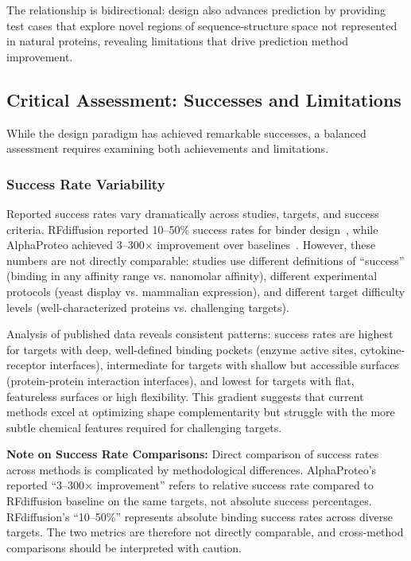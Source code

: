 The relationship is bidirectional: design also advances prediction by providing test cases that explore novel regions of sequence-structure space not represented in natural proteins, revealing limitations that drive prediction method improvement.

\subsection{Critical Assessment: Successes and Limitations}
\label{subsec:critical}

While the design paradigm has achieved remarkable successes, a balanced assessment requires examining both achievements and limitations.

\subsubsection{Success Rate Variability}

Reported success rates vary dramatically across studies, targets, and success criteria. RFdiffusion reported 10--50\% success rates for binder design~\citep{watson2023rfdiffusion}, while AlphaProteo achieved 3--300$\times$ improvement over baselines~\citep{zambaldi2024alphaproteo}. However, these numbers are not directly comparable: studies use different definitions of ``success'' (binding in any affinity range vs. nanomolar affinity), different experimental protocols (yeast display vs. mammalian expression), and different target difficulty levels (well-characterized proteins vs. challenging targets).

Analysis of published data reveals consistent patterns: success rates are highest for targets with deep, well-defined binding pockets (enzyme active sites, cytokine-receptor interfaces), intermediate for targets with shallow but accessible surfaces (protein-protein interaction interfaces), and lowest for targets with flat, featureless surfaces or high flexibility. This gradient suggests that current methods excel at optimizing shape complementarity but struggle with the more subtle chemical features required for challenging targets.

\vspace{0.5em}
\noindent
\textbf{Note on Success Rate Comparisons:} Direct comparison of success rates across methods is complicated by methodological differences. AlphaProteo's reported ``3--300$\times$ improvement'' refers to relative success rate compared to RFdiffusion baseline on the same targets, not absolute success percentages. RFdiffusion's ``10--50\%'' represents absolute binding success rates across diverse targets. The two metrics are therefore not directly comparable, and cross-method comparisons should be interpreted with caution.

